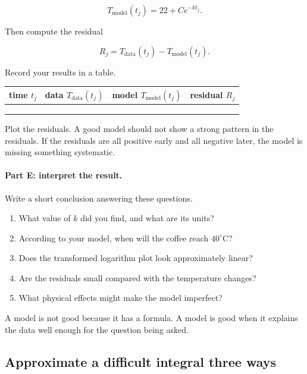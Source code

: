 \[
T_{\text{model}}(t_j)=22+Ce^{-kt_j}.
\]

Then compute the residual

\[
R_j=T_{\text{data}}(t_j)-T_{\text{model}}(t_j).
\]

Record your results in a table.

\begin{center}
\renewcommand{\arraystretch}{1.35}
\begin{tabular}{c|c|c|c}
\textbf{time} \(t_j\) &
\textbf{data} \(T_{\text{data}}(t_j)\) &
\textbf{model} \(T_{\text{model}}(t_j)\) &
\textbf{residual} \(R_j\) \\ \hline
 & & & \\
 & & & \\
 & & &
\end{tabular}
\end{center}

Plot the residuals.  A good model should not show a strong pattern in the residuals.
If the residuals are all positive early and all negative later, the model is missing
something systematic.

\paragraph{Part E: interpret the result.}
Write a short conclusion answering these questions.

\begin{enumerate}
\item What value of \(k\) did you find, and what are its units?

\item According to your model, when will the coffee reach \(40^\circ\text{C}\)?

\item Does the transformed logarithm plot look approximately linear?

\item Are the residuals small compared with the temperature changes?

\item What physical effects might make the model imperfect?
\end{enumerate}

A model is not good because it has a formula.  A model is good when it explains the
data well enough for the question being asked.

\subsection{Approximate a difficult integral three ways}
\label{subsec:project-approximate-difficult-integral}


